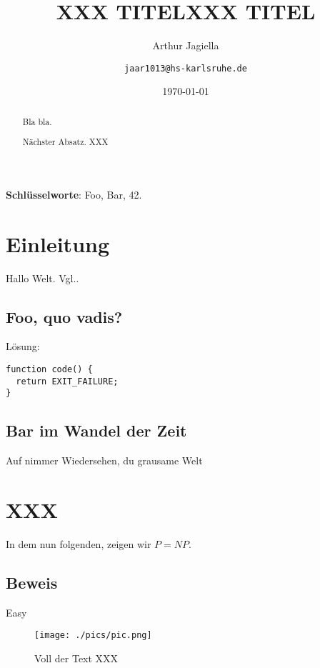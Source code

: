 \documentclass[
a4paper,   %
11pt,      %
oneside,   %
onecolumn, %
final      %
]{article}
\title{XXX TITEL}
\author{Arthur Jagiella \and \texttt{jaar1013@hs-karlsruhe.de}}
\date{\today}
\begin{document}
%
\title{XXX TITEL}
\maketitle



\begin{abstract}
Bla bla.

Nächster Absatz. XXX
\end{abstract}
\textbf{Schlüsselworte}: Foo, Bar, 42.

\section{Einleitung} %
Hallo Welt. Vgl.\cite{bestArticle}.

\subsection{Foo, quo vadis?}
Lösung:
\begin{lstlisting}[language=PseudoCode,caption={XXX},label=lst:code1]
function code() {
  return EXIT_FAILURE;
}
\end{lstlisting}

\subsection{Bar im Wandel der Zeit}
Auf nimmer Wiedersehen, du grausame Welt

\section{XXX}
In dem nun folgenden, zeigen wir $P=NP$.

\subsection{Beweis} \label{subsec:aircontrol}
Easy

\begin{wrapfigure}[13]{Rth}{0.45\textwidth}
    \centering
    \texttt{[image: ./pics/pic.png]}
	\caption[format=plain]{Voll der Text XXX}
	\label{fig:ref1}
\end{wrapfigure}
\end{document}
